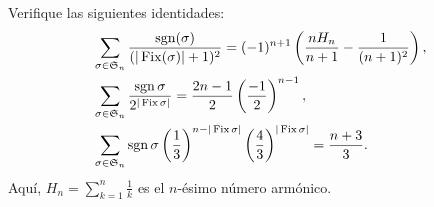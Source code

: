 \documentclass[12pt]{memoir}
\begin{document}
\begin{Ej}[Extra]%
    Verifique las siguientes identidades:
    \begin{align}
        &\sum_{\sigma\in \mathfrak{S}_n}\frac{\operatorname{sgn}(\sigma)}{(|\operatorname{Fix}(\sigma)|+1)^2} = (-1)^{n+1}\left(\frac{nH_n}{n+1} - \frac{1}{(n+1)^2}\right),\\
        &\sum_{\sigma\in\mathfrak{S}_n}\frac{\operatorname{sgn}\sigma}{2^{|\operatorname{Fix}\sigma|}} = \frac{2n - 1}{2}\left(\frac{-1}{2}\right)^{n - 1},\\
        &\sum_{\sigma\in\mathfrak{S}_n} \operatorname{sgn}\sigma\left(\frac{1}{3}\right)^{n - |\operatorname{Fix}\sigma|}\left(\frac{4}{3}\right)^{|\operatorname{Fix}\sigma|} = \frac{n+3}{3}.
    \end{align}
    Aquí, $H_n = \sum_{k=1}^{n}\frac{1}{k}$ es el $n$-ésimo número armónico.
\end{Ej}
\end{document}
